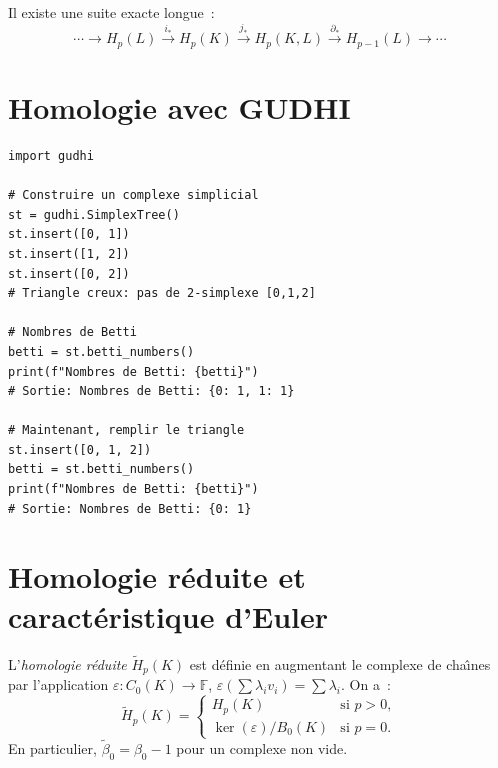 \begin{theoreme}
Il existe une suite exacte longue~:
\[
  \cdots \to H_p(L) \xrightarrow{i_*} H_p(K)
  \xrightarrow{j_*} H_p(K, L)
  \xrightarrow{\partial_*} H_{p-1}(L) \to \cdots
\]
\end{theoreme}

\section{Homologie avec GUDHI}

\begin{codeblock}[title=\textbf{Calcul d'homologie avec GUDHI}]
\begin{verbatim}
import gudhi

# Construire un complexe simplicial
st = gudhi.SimplexTree()
st.insert([0, 1])
st.insert([1, 2])
st.insert([0, 2])
# Triangle creux: pas de 2-simplexe [0,1,2]

# Nombres de Betti
betti = st.betti_numbers()
print(f"Nombres de Betti: {betti}")
# Sortie: Nombres de Betti: {0: 1, 1: 1}

# Maintenant, remplir le triangle
st.insert([0, 1, 2])
betti = st.betti_numbers()
print(f"Nombres de Betti: {betti}")
# Sortie: Nombres de Betti: {0: 1}
\end{verbatim}
\end{codeblock}

\section{Homologie r\'eduite et caract\'eristique d'Euler}

\begin{definition}
L'\emph{homologie r\'eduite} $\tilde{H}_p(K)$ est d\'efinie en
augmentant le complexe de cha\^{\i}nes par l'application
$\varepsilon : C_0(K) \to \mathbb{F}$, $\varepsilon(\sum \lambda_i v_i)
= \sum \lambda_i$. On a~:
\[
  \tilde{H}_p(K) = \begin{cases}
    H_p(K) & \text{si } p > 0, \\
    \ker(\varepsilon) / B_0(K) & \text{si } p = 0.
  \end{cases}
\]
En particulier, $\tilde{\beta}_0 = \beta_0 - 1$ pour un complexe
non vide.
\end{definition}

